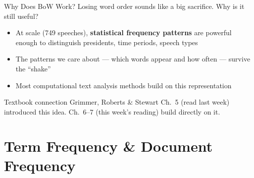\documentclass[aspectratio=169,11pt]{beamer}
\begin{document}
\begin{frame}{Why Does BoW Work?}
    Losing word order sounds like a big sacrifice. Why is it still useful?

    \vspace{0.4cm}

    \begin{itemize}
        \item At scale (749 speeches), \textbf{statistical frequency patterns} are powerful enough to distinguish presidents, time periods, speech types
        \item The patterns we care about --- which words appear and how often --- survive the ``shake''
        \item Most computational text analysis methods build on this representation
    \end{itemize}

    \vspace{0.4cm}

    \begin{alertblock}{Textbook connection}
        Grimmer, Roberts \& Stewart Ch.\ 5 (read last week) introduced this idea.
        Ch.\ 6--7 (this week's reading) build directly on it.
    \end{alertblock}
\end{frame}

\section{Term Frequency \& Document Frequency}
\end{document}
